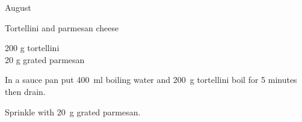 \begin{menu}{August}
\begin{recipe}{1}{Tortellini and parmesan cheese}
		\begin{ingredients}
		200 g tortellini  \\
	20 g grated parmesan  \\
	
		\end{ingredients}
	
    \begin{instructions}
    \item 
      In a
      sauce pan
      put
      400~ml  boiling water
      and
      200~g  tortellini
      boil for 5 minutes then drain.
    \item 
        Sprinkle with
        20~g  grated parmesan.
      
    \end{instructions}
    \end{recipe}%
  
    \clearpage
    \end{menu}
	
